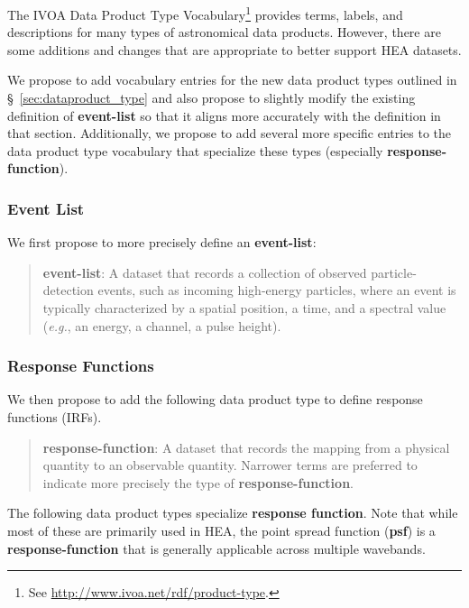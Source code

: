 \documentclass[11pt,a4paper]{ivoa}
\begin{document}
The \gls{IVOA} Data Product Type Vocabulary\footnote{See \url{http://www.ivoa.net/rdf/product-type}.} provides terms, labels, and descriptions for many types of astronomical data products. However, there are some additions and changes that are appropriate to better support \gls{HEA} datasets.

We propose to add vocabulary entries for the new data product types outlined in \S~\ref{sec:dataproduct_type} and also propose to slightly modify the existing definition of {\bf event-list} so that it aligns more accurately with the definition in that section.  Additionally, we propose to add several more specific entries to the data product type vocabulary that specialize these types (especially {\bf response-function}).


\subsubsection{Event List}

We first propose to more precisely define an {\bf event-list}:

\begin{quote}
{\bf event-list}: A dataset that records a collection of observed particle-detection events, such as incoming high-energy particles, where an event is typically characterized by a spatial position, a time, and a spectral value ({\em e.g.\/}, an energy, a channel, a pulse height).
\end{quote}

\subsubsection{Response Functions}
\label{sec:responsefct}

We then propose to add the following data product type to define response functions (\glspl{IRF}).

\begin{quote}
 {\bf response-function}: A dataset that records the mapping from a physical quantity to an observable quantity.  Narrower terms are preferred to indicate more precisely the type of {\bf response-function}.
 \end{quote}

The following data product types specialize {\bf response function}.  Note that while most of these are primarily used in \gls{HEA}, the point spread function ({\bf psf}) is a {\bf response-function} that is generally applicable across multiple wavebands.
 
\end{document}
